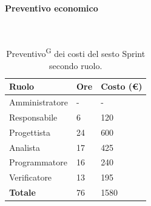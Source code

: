 \documentclass[8pt]{article}
\newcommand{\glossterm}[1]{#1\textsuperscript{G}} %
\newcommand{\subsubsubsection}[1]{\paragraph{#1}\mbox{}\\}
\begin{document}
\subsubsubsection{Preventivo economico}
\begin{table}[ht!]
	\centering
	\begin{tabular}{p{4cm} p{1cm} p{2cm}}
        \toprule
        \textbf{Ruolo} & \textbf{Ore} & \textbf{Costo (€)} \\
        \midrule
        Amministratore & -  & -   \\
        Responsabile   & 6  & 120 \\
        Progettista    & 24 & 600 \\
        Analista       & 17 & 425 \\
        Programmatore  & 16 & 240 \\
        Verificatore   & 13 & 195 \\
        \midrule
        \textbf{Totale} & 76 & 1580 \\
        \bottomrule
    \end{tabular}
    \caption{\glossterm{Preventivo} dei costi del sesto Sprint secondo ruolo.}
	\label{table:Preventivo dei costi del sesto Sprint secondo ruolo}
\end{table}
\end{document}
